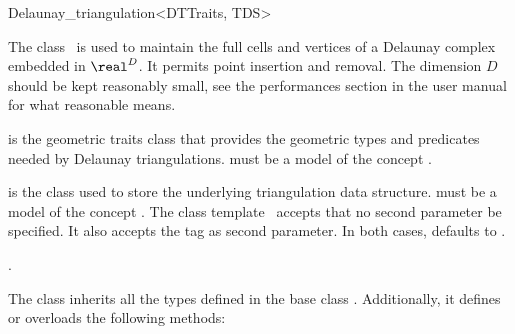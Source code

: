 \begin{ccRefClass}{Delaunay_triangulation<DTTraits, TDS>}

\ccDefinition

The class \ccRefName\ is used to maintain the full cells and vertices of a
Delaunay complex embedded in $\real^D$. It permits point insertion and
removal. The dimension $D$ should be kept reasonably small,
see the performances section in the user manual for what reasonable
means.


\ccParameters

 is the geometric traits class that provides the geometric types
and predicates needed by Delaunay triangulations.  must be a model of
the concept .

 is the class used to store the underlying triangulation data
structure.  must be a model of the concept
. The class template \ccRefName\ accepts that no
second parameter be specified. It also accepts the tag  as
second parameter. In both cases,  defaults to
.


\ccInheritsFrom
{}.

The class  inherits all the types
defined in the base class . Additionally, it
defines or overloads the following methods:

\ccCreation %






\end{ccRefClass}
